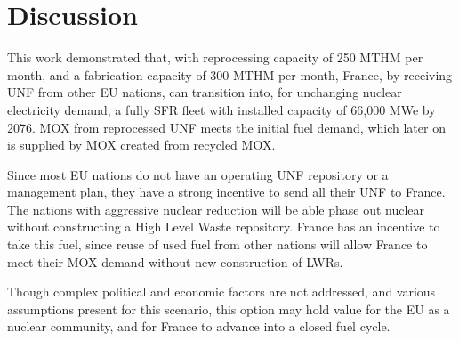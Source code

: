 \section{Discussion}
This work demonstrated that, with reprocessing capacity of 250 MTHM per month,
and a fabrication capacity of 300 MTHM per month,
France, by receiving \gls{UNF} from other \gls{EU} nations,
 can transition into, for unchanging nuclear electricity demand,
a fully \gls{SFR} fleet
with installed capacity of 66,000 MWe by 2076.
\gls{MOX} from reprocessed \gls{UNF} meets the initial fuel demand,
which later on is supplied by \gls{MOX} created from recycled \gls{MOX}.

Since most \gls{EU} nations do not have an operating \gls{UNF}
repository or a management plan, they have a strong incentive
to send all their \gls{UNF} to France. The nations
with aggressive nuclear reduction will be able phase out nuclear
without constructing a High Level Waste repository. France has an
incentive to take this fuel, since reuse of used fuel from
other nations will allow France to meet their MOX demand
without new construction of \glspl{LWR}.

Though complex political and economic factors are not
addressed, and various assumptions present for this scenario,
this option may hold value for the \gls{EU} as a nuclear community,
and for France to advance into a closed fuel cycle.
